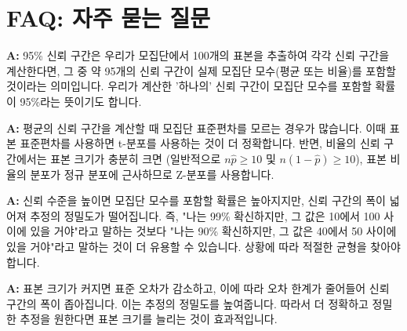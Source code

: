 \documentclass[11pt,a4paper]{article}
\begin{document}
\newpage
\section*{FAQ: 자주 묻는 질문}

\begin{tcolorbox}[colback=myblue!10!white, colframe=myblue!75!black, title=Q1: 95\% 신뢰 구간이 정확히 무엇을 의미하나요?]
\textbf{A:} 95\% 신뢰 구간은 우리가 모집단에서 100개의 표본을 추출하여 각각 신뢰 구간을 계산한다면, 그 중 약 95개의 신뢰 구간이 실제 모집단 모수(평균 또는 비율)를 포함할 것이라는 의미입니다. 우리가 계산한 '하나의' 신뢰 구간이 모집단 모수를 포함할 확률이 95\%라는 뜻이기도 합니다.
\end{tcolorbox}

\begin{tcolorbox}[colback=mygreen!10!white, colframe=mygreen!75!black, title=Q2: 왜 평균 신뢰 구간에서는 t-분포를 사용하고, 비율 신뢰 구간에서는 Z-분포를 사용하나요?]
\textbf{A:} 평균의 신뢰 구간을 계산할 때 모집단 표준편차를 모르는 경우가 많습니다. 이때 표본 표준편차를 사용하면 t-분포를 사용하는 것이 더 정확합니다. 반면, 비율의 신뢰 구간에서는 표본 크기가 충분히 크면 (일반적으로 $n\hat{p} \ge 10$ 및 $n(1-\hat{p}) \ge 10$), 표본 비율의 분포가 정규 분포에 근사하므로 Z-분포를 사용합니다.
\end{tcolorbox}

\begin{tcolorbox}[colback=myred!10!white, colframe=myred!75!black, title=Q3: 신뢰 수준을 높이면 항상 좋은 건가요?]
\textbf{A:} 신뢰 수준을 높이면 모집단 모수를 포함할 확률은 높아지지만, 신뢰 구간의 폭이 넓어져 추정의 정밀도가 떨어집니다. 즉, "나는 99\% 확신하지만, 그 값은 10에서 100 사이에 있을 거야"라고 말하는 것보다 "나는 90\% 확신하지만, 그 값은 40에서 50 사이에 있을 거야"라고 말하는 것이 더 유용할 수 있습니다. 상황에 따라 적절한 균형을 찾아야 합니다.
\end{tcolorbox}

\begin{tcolorbox}[colback=myyellow!10!white, colframe=myyellow!75!black, title=Q4: 표본 크기가 신뢰 구간에 어떤 영향을 미치나요?]
\textbf{A:} 표본 크기가 커지면 표준 오차가 감소하고, 이에 따라 오차 한계가 줄어들어 신뢰 구간의 폭이 좁아집니다. 이는 추정의 정밀도를 높여줍니다. 따라서 더 정확하고 정밀한 추정을 원한다면 표본 크기를 늘리는 것이 효과적입니다.
\end{tcolorbox}

\newpage
\end{document}

